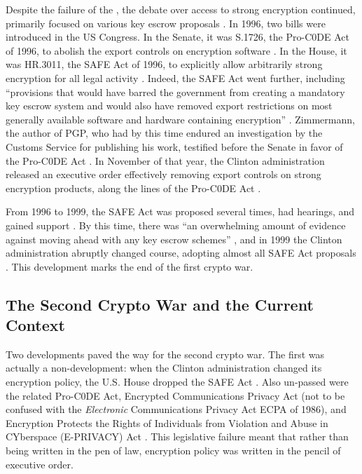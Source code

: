 Despite the failure of the , the debate over access to strong encryption continued, primarily focused
on various key escrow proposals \cite{thompson_2015}. In 1996, two bills were introduced in the US Congress. In the
Senate, it was S.1726, the Pro-C0DE Act of 1996, to abolish the export controls on encryption software
\cite{burns_s1726_1996}. In the House, it was HR.3011, the SAFE Act of 1996, to explicitly allow arbitrarily strong
encryption for all legal activity \cite{goodlatte_hr3011_1996}. Indeed, the SAFE Act went further, including
``provisions that would have barred the government from creating a mandatory key escrow system and would also have
removed export restrictions on most generally available software and hardware containing encryption''
\cite{kehl_right_2015}. Zimmermann, the author of PGP, who had by this time endured an investigation by the Customs
Service for publishing his work, testified before the Senate in favor of the Pro-C0DE Act \cite{zimmermann_1996}. In
November of that year, the Clinton administration released an executive order effectively removing export controls on
strong encryption products, along the lines of the Pro-C0DE Act \cite{clinton_1996}.

From 1996 to 1999, the SAFE Act was proposed several times, had hearings, and gained support \cite{kehl_right_2015}. By
this time, there was ``an overwhelming amount of evidence against moving ahead with any key escrow schemes''
\cite{thompson_2015}, and in 1999 the Clinton administration abruptly changed course, adopting almost all SAFE Act
proposals \cite{kehl_right_2015}. This development marks the end of the first crypto war.

\subsection{The Second Crypto War and the Current Context}
\label{sec-cwii-context}

Two developments paved the way for the second crypto war. The first was actually a non-development: when the Clinton
administration changed its encryption policy, the U.S. House dropped the SAFE Act \cite{kehl_right_2015}. Also un-passed
were the related Pro-C0DE Act, Encrypted Communications Privacy Act (not to be confused with the \textit{Electronic}
Communications Privacy Act \acs{ECPA} of 1986), and Encryption Protects the Rights of Individuals from Violation and
Abuse in CYberspace (E-PRIVACY) Act \cite{leahy_s376_1997} \cite{ashcroft_s2067_1998}. This legislative failure meant
that rather than being written in the pen of law, encryption policy was written in the pencil of executive order.

